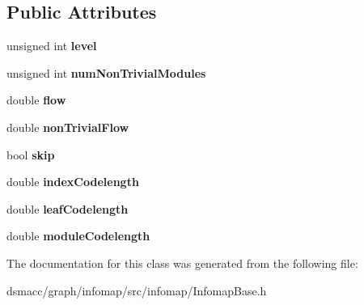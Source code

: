 \subsection*{Public Attributes}
\begin{DoxyCompactItemize}
\item 
\mbox{\label{classPartitionQueue_aa54d8befd904cc1bc196938e24984fb4}} 
unsigned int {\bfseries level}
\item 
\mbox{\label{classPartitionQueue_a4afaf66d6969dfff46b6e5a7fd54047f}} 
unsigned int {\bfseries num\+Non\+Trivial\+Modules}
\item 
\mbox{\label{classPartitionQueue_a3aec4e6e3f93512134b2f9ca38e7ae4e}} 
double {\bfseries flow}
\item 
\mbox{\label{classPartitionQueue_a3c3b7673ba17ebbfe9b61d916509677d}} 
double {\bfseries non\+Trivial\+Flow}
\item 
\mbox{\label{classPartitionQueue_ab664fd0ad3de9d593fa006f229705968}} 
bool {\bfseries skip}
\item 
\mbox{\label{classPartitionQueue_a6ec8cf4391ab1d2e5c5d9c578608ba9c}} 
double {\bfseries index\+Codelength}
\item 
\mbox{\label{classPartitionQueue_aa52ae4855508fe7eca9f3eb063e44d4c}} 
double {\bfseries leaf\+Codelength}
\item 
\mbox{\label{classPartitionQueue_a5fa431c0cd935d272601b92c75203976}} 
double {\bfseries module\+Codelength}
\end{DoxyCompactItemize}


The documentation for this class was generated from the following file\+:\begin{DoxyCompactItemize}
\item 
dsmacc/graph/infomap/src/infomap/Infomap\+Base.\+h\end{DoxyCompactItemize}
